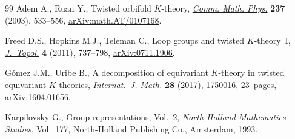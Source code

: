 \documentclass[11pt]{article}
\numberwithin{equation}{section}
\theoremstyle{definition}
\numberwithin{equation}{section}
\begin{document}
%
\begin{thebibliography}{99}
Adem A., Ruan Y., Twisted orbifold {$K$}-theory, \href{https://doi.org/10.1007/s00220-003-0849-x}{\textit{Comm. Math. Phys.}}
 \textbf{237} (2003), 533--556, \href{https://arxiv.org/abs/math.AT/0107168}{arXiv:math.AT/0107168}.

Freed D.S., Hopkins M.J., Teleman C., Loop groups and twisted {$K$}-theory~{I},
 \href{https://doi.org/10.1112/jtopol/jtr019}{\textit{J.~Topol.}} \textbf{4} (2011), 737--798, \href{https://arxiv.org/abs/0711.1906}{arXiv:0711.1906}.

G\'omez J.M., Uribe B., A decomposition of equivariant {$K$}-theory in twisted
 equivariant {$K$}-theories, \href{https://doi.org/10.1142/S0129167X17500161}{\textit{Internat.~J. Math.}} \textbf{28} (2017),
 1750016, 23~pages, \href{https://arxiv.org/abs/1604.01656}{arXiv:1604.01656}.

Karpilovsky G., Group representations, {V}ol.~2, \textit{North-Holland
 Mathematics Studies}, Vol.~177, North-Holland Publishing Co., Amsterdam,
 1993.

\end{thebibliography}
\end{document}
